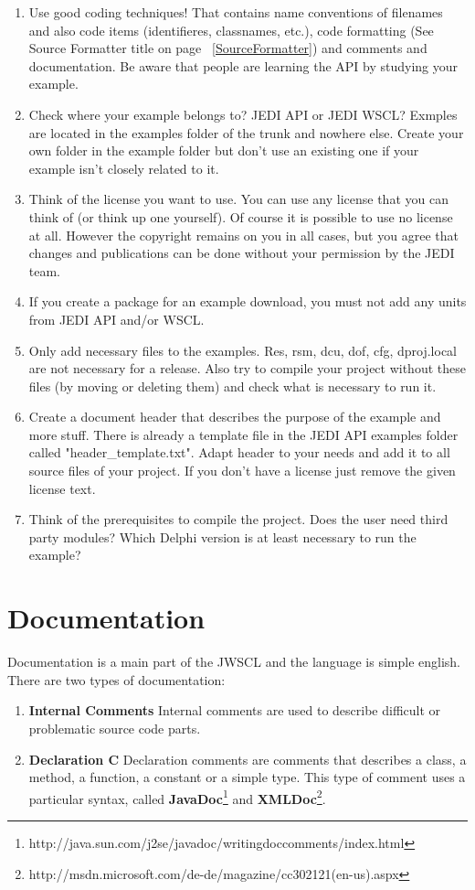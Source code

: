 \documentclass[a4paper,oneside,10pt]{article}
\begin{document}
\begin{enumerate}
  \item Use good coding techniques! That contains name conventions of filenames and also code items (identifieres, classnames, etc.), code formatting (See Source Formatter title on page ~\ref{SourceFormatter}) and comments and documentation. Be aware that people are learning the API by studying your example.
  \item Check where your example belongs to? JEDI API or JEDI WSCL? Exmples are located in the examples folder of the trunk and nowhere else. Create your own folder in the example folder but don't use an existing one if your example isn't closely related to it.
  \item Think of the license you want to use. You can use any license that you can think of (or think up one yourself). Of course it is possible to use no license at all. However the copyright remains on you in all cases, but you agree that changes and publications can be done without your permission by the JEDI team.
  \item If you create a package for an example download, you must not add any units from JEDI API and/or WSCL.
  \item Only add necessary files to the examples. Res, rsm, dcu, dof, cfg, dproj.local are not necessary for a release. Also try to compile your project without these files (by moving or deleting them) and check what is necessary to run it.
  \item Create a document header that describes the purpose of the example and more stuff. There is already a template file in the JEDI API examples folder called "header\_template.txt". Adapt header to your needs and add it to all source files of your project. If you don't have a license just remove the given license text.
  \item Think of the prerequisites to compile the project. Does the user need third party modules? Which Delphi version is at least necessary to run the example? 
\end{enumerate}

\section{Documentation}
Documentation is a main part of the JWSCL and the language is simple english. There are two types of documentation:
\begin{enumerate}
	\item \textbf{Internal Comments} Internal comments are used to describe difficult or problematic source code parts. 

	\item \textbf{Declaration C} Declaration comments are comments that describes a class, a method, a function, a constant or a simple type. This type of comment uses a particular syntax, called \textbf{JavaDoc}\footnote{http://java.sun.com/j2se/javadoc/writingdoccomments/index.html} and \textbf{XMLDoc}\footnote{http://msdn.microsoft.com/de-de/magazine/cc302121(en-us).aspx}.
\end{enumerate}
\end{document}
